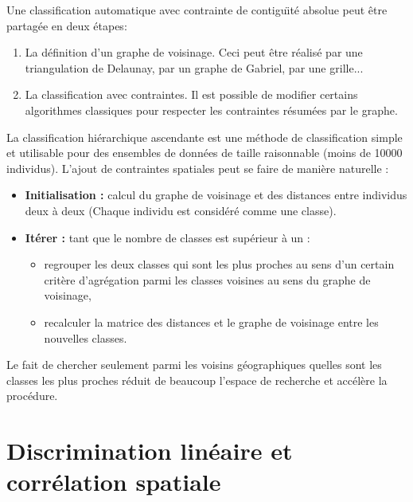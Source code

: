 Une classification automatique avec contrainte de contigu\"{\i}t\'e absolue peut
\^{e}tre partag\'{e}e en deux \'{e}tapes: 
\begin{enumerate}
\item La d\'{e}finition d'un graphe de voisinage. Ceci peut \^{e}tre r\'{e}alis\'{e} par
une triangulation de Delaunay, par un graphe de Gabriel, par une grille...
\item La classification avec contraintes. Il est possible de modifier certains
algorithmes classiques pour respecter les contraintes r\'{e}sum\'{e}es par le graphe.
\end{enumerate}
  
\begin{ex}\cite{Lebart1978}
La classification hi\'erarchique ascendante est une m\'ethode de classification
simple et utilisable pour des ensembles de donn\'ees de taille raisonnable
(moins de 10000 individus).
L'ajout de contraintes spatiales peut se faire de mani\`ere naturelle :
\begin{itemize}
\item 
{\bf Initialisation :} 
calcul du graphe de voisinage et des distances entre
individus deux \`a deux (Chaque individu est consid\'er\'e comme une classe).
\item 
{\bf It\'erer :} tant que le nombre de classes est sup\'erieur \`a un :
\begin{itemize}
\item 
regrouper les deux classes qui sont les plus proches au sens d'un
certain crit\`ere d'agr\'egation parmi les classes voisines au sens
du graphe de voisinage,
\item 
recalculer la matrice des distances et le graphe de voisinage
entre les nouvelles classes.
\end{itemize}
\end{itemize}

Le fait de chercher seulement parmi les voisins g\'eographiques quelles
sont les classes  les plus proches r\'eduit de beaucoup l'espace de recherche et
acc\'el\`ere la proc\'edure. 
\end{ex}






\section{Discrimination lin\'eaire et corr\'elation spatiale}

